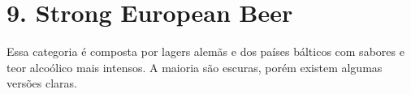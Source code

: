 \section*{9. Strong European Beer}

Essa categoria é composta por lagers alemãs e dos países bálticos com sabores e teor alcoólico mais intensos. A maioria são escuras, porém existem algumas versões claras.
